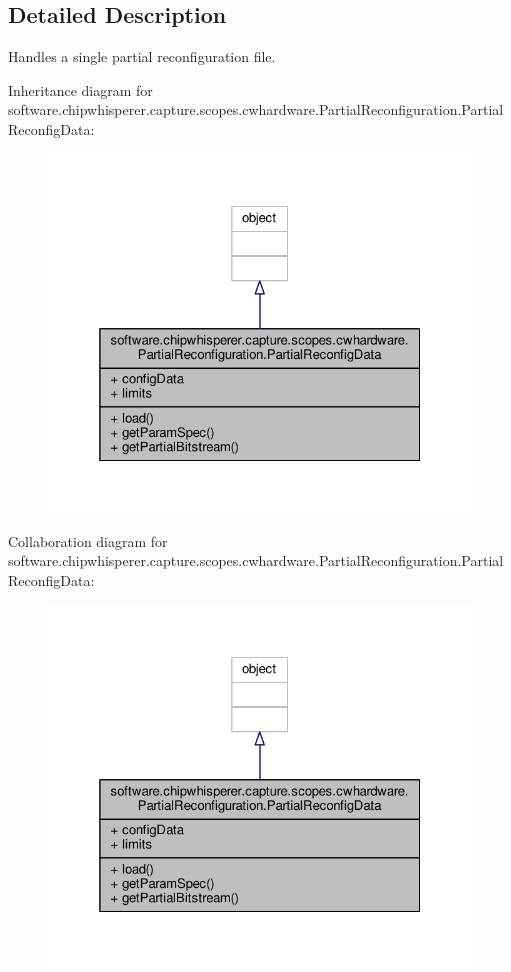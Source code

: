 \subsection{Detailed Description}
\begin{DoxyVerb}Handles a single partial reconfiguration file. \end{DoxyVerb}
 

Inheritance diagram for software.\+chipwhisperer.\+capture.\+scopes.\+cwhardware.\+Partial\+Reconfiguration.\+Partial\+Reconfig\+Data\+:\nopagebreak
\begin{figure}[H]
\begin{center}
\leavevmode
\includegraphics[width=325pt]{d7/ddd/classsoftware_1_1chipwhisperer_1_1capture_1_1scopes_1_1cwhardware_1_1PartialReconfiguration_1_1P89f855673351ef8fcaa4ae2e6288108c}
\end{center}
\end{figure}


Collaboration diagram for software.\+chipwhisperer.\+capture.\+scopes.\+cwhardware.\+Partial\+Reconfiguration.\+Partial\+Reconfig\+Data\+:\nopagebreak
\begin{figure}[H]
\begin{center}
\leavevmode
\includegraphics[width=325pt]{df/d5d/classsoftware_1_1chipwhisperer_1_1capture_1_1scopes_1_1cwhardware_1_1PartialReconfiguration_1_1PartialReconfigData__coll__graph}
\end{center}
\end{figure}



